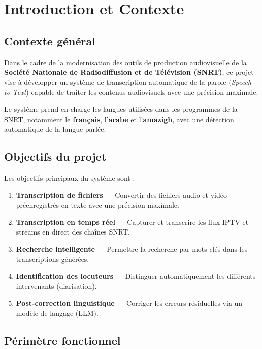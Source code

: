 \documentclass[12pt,a4paper]{report}
\begin{document}
\chapter{Introduction et Contexte}

\section{Contexte général}

Dans le cadre de la modernisation des outils de production audiovisuelle de la \textbf{Société Nationale de Radiodiffusion et de Télévision (SNRT)}, ce projet vise à développer un système de transcription automatique de la parole (\textit{Speech-to-Text}) capable de traiter les contenus audiovisuels avec une précision maximale.

Le système prend en charge les langues utilisées dans les programmes de la SNRT, notamment le \textbf{français}, l'\textbf{arabe} et l'\textbf{amazigh}, avec une détection automatique de la langue parlée.

\section{Objectifs du projet}

Les objectifs principaux du système sont :

\begin{enumerate}[label=\textbf{\arabic*.}]
    \item \textbf{Transcription de fichiers} — Convertir des fichiers audio et vidéo préenregistrés en texte avec une précision maximale.
    \item \textbf{Transcription en temps réel} — Capturer et transcrire les flux IPTV et streams en direct des chaînes SNRT.
    \item \textbf{Recherche intelligente} — Permettre la recherche par mots-clés dans les transcriptions générées.
    \item \textbf{Identification des locuteurs} — Distinguer automatiquement les différents intervenants (diarisation).
    \item \textbf{Post-correction linguistique} — Corriger les erreurs résiduelles via un modèle de langage (LLM).
\end{enumerate}

\section{Périmètre fonctionnel}
\end{document}
